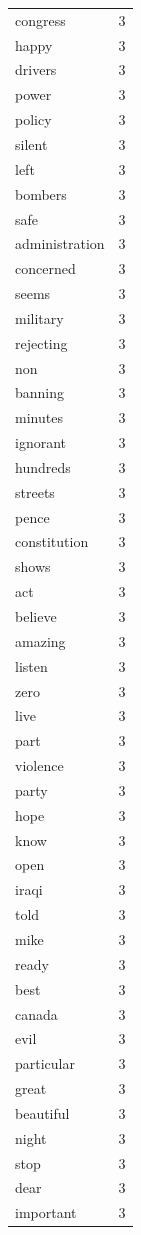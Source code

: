 \begin{tabular}{lr}
congress & 3 \\
happy & 3 \\
drivers & 3 \\
power & 3 \\
policy & 3 \\
silent & 3 \\
left & 3 \\
bombers & 3 \\
safe & 3 \\
administration & 3 \\
concerned & 3 \\
seems & 3 \\
military & 3 \\
rejecting & 3 \\
non & 3 \\
banning & 3 \\
minutes & 3 \\
ignorant & 3 \\
hundreds & 3 \\
streets & 3 \\
pence & 3 \\
constitution & 3 \\
shows & 3 \\
act & 3 \\
believe & 3 \\
amazing & 3 \\
listen & 3 \\
zero & 3 \\
live & 3 \\
part & 3 \\
violence & 3 \\
party & 3 \\
hope & 3 \\
know & 3 \\
open & 3 \\
iraqi & 3 \\
told & 3 \\
mike & 3 \\
ready & 3 \\
best & 3 \\
canada & 3 \\
evil & 3 \\
particular & 3 \\
great & 3 \\
beautiful & 3 \\
night & 3 \\
stop & 3 \\
dear & 3 \\
important & 3 \\

\end{tabular}
